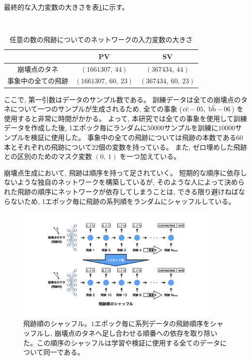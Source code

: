 最終的な入力変数の大きさを表\ref{VLSTMInputParameterShape}に示す。

\begin{table}[htb]
 \centering
　\small
  \caption{任意の数の飛跡についてのネットワークの入力変数の大きさ}
  \begin{tabular}{c | c c}\hline
    & PV & SV\\\hline
    崩壊点のタネ & $(1661307,\ 44)$ & $(367434,\ 44)$\\
    事象中の全ての飛跡 & $(1661307,\ 60,\ 23)$ & $(367434,\ 60,\ 23)$\\\hline
  \end{tabular}
  \label{VLSTMInputParameterShape}
\end{table}

ここで, 第一引数はデータのサンプル数である。
訓練データは全ての崩壊点のタネについて一つのサンプルが生成されるため, 全ての事象 ($\rm c\bar{c}-05,\ \rm b\bar{b}-06$) を使用すると非常に時間がかかる。
よって, 本研究では全ての事象を使用して訓練データを作成した後, 1エポック毎にランダムに$50000$サンプルを訓練に$10000$サンプルを検証に使用した。
事象中の全ての飛跡については飛跡の本数である$60$本とそれぞれの飛跡について$22$個の変数を持っている。
また, ゼロ埋めした飛跡との区別のためのマスク変数 $(0,\ 1)$ を一つ加えている。

崩壊点生成において, 飛跡は順序を持って足されていく。
短期的な順序に依存しないような独自のネットワークを構築しているが, そのような人によって決められた飛跡の順序にネットワークが依存してしまうことは, できる限り避けねばならないため, 1エポック毎に飛跡の系列順をランダムにシャッフルしている。

\begin{figure}[htbp]
 \centering
 \includegraphics[trim = 150 100 150 100, width=0.9\textwidth, clip]{Figure/3Networks/3-4-2-1TrackShuffle.png}
 \caption[飛跡順のシャッフル]{飛跡順のシャッフル。$1$エポック毎に系列データの飛跡順序をシャッフルし, 崩壊点のタネへ足し合わせる順番への依存を取り除いた。この順序のシャッフルは学習や検証に使用する全てのデータについて同一である。}
 \label{3-4-2-1TrackShuffle}
\end{figure}

